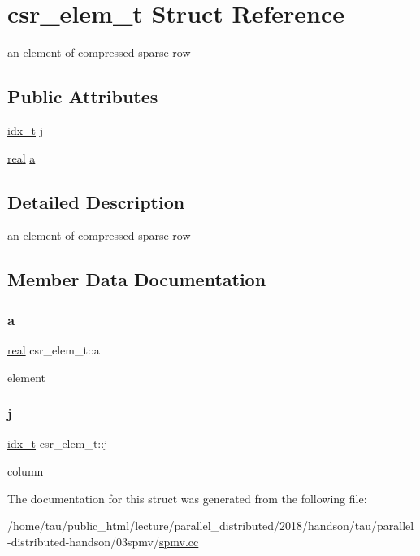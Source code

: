 \hypertarget{structcsr__elem__t}{}\section{csr\+\_\+elem\+\_\+t Struct Reference}
\label{structcsr__elem__t}


an element of compressed sparse row  


\subsection*{Public Attributes}
\begin{DoxyCompactItemize}
\item 
\hyperlink{spmv_8cc_a8e93478a00e685bea5e6a3f617bf03a3}{idx\+\_\+t} \hyperlink{structcsr__elem__t_a4525598ab26d6263b2242cc33511ca7f}{j}
\item 
\hyperlink{spmv_8cc_a11d147c64891830c9e79b3315b1b2e21}{real} \hyperlink{structcsr__elem__t_a55e480eefa495ee8b6e359a5f5a94a4f}{a}
\end{DoxyCompactItemize}


\subsection{Detailed Description}
an element of compressed sparse row 

\subsection{Member Data Documentation}
\mbox{\label{structcsr__elem__t_a55e480eefa495ee8b6e359a5f5a94a4f}} 
\subsubsection{\texorpdfstring{a}{a}}
{\footnotesize\ttfamily \hyperlink{spmv_8cc_a11d147c64891830c9e79b3315b1b2e21}{real} csr\+\_\+elem\+\_\+t\+::a}

element \mbox{\label{structcsr__elem__t_a4525598ab26d6263b2242cc33511ca7f}} 
\subsubsection{\texorpdfstring{j}{j}}
{\footnotesize\ttfamily \hyperlink{spmv_8cc_a8e93478a00e685bea5e6a3f617bf03a3}{idx\+\_\+t} csr\+\_\+elem\+\_\+t\+::j}

column 

The documentation for this struct was generated from the following file\+:\begin{DoxyCompactItemize}
\item 
/home/tau/public\+\_\+html/lecture/parallel\+\_\+distributed/2018/handson/tau/parallel-\/distributed-\/handson/03spmv/\hyperlink{spmv_8cc}{spmv.\+cc}\end{DoxyCompactItemize}
